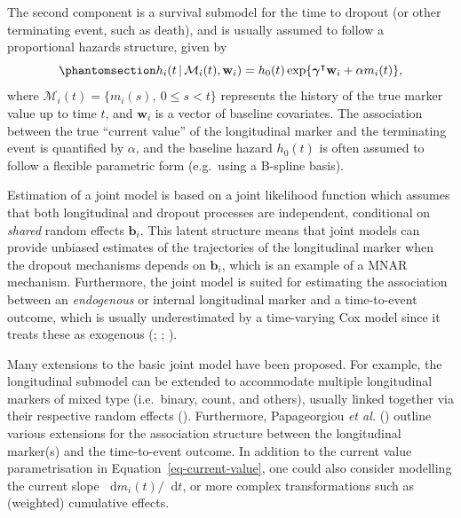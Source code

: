 \documentclass[
  letterpaper,
  DIV=11,
  numbers=noendperiod]{scrreprt}
\newcommand{\given}{\,|\,}
\newcommand\diff{\mathop{}\!\mathrm{d}}
\begin{document}
The second component is a survival submodel for the time to dropout (or
other terminating event, such as death), and is usually assumed to
follow a proportional hazards structure, given by
\begin{equation}\phantomsection\label{eq-current-value}{
h_i(t \given \mathcal{M}_i(t),\mathbf{w}_i) = h_0(t)\exp\{\boldsymbol{\gamma}^\intercal\mathbf{w}_i + \alpha m_i(t)\},
}\end{equation} where \(\mathcal{M}_i(t) = \{m_i(s), \ 0 \leq s < t\}\)
represents the history of the true marker value up to time \(t\), and
\(\mathbf{w}_i\) is a vector of baseline covariates. The association
between the true ``current value'' of the longitudinal marker and the
terminating event is quantified by \(\alpha\), and the baseline hazard
\(h_0(t)\) is often assumed to follow a flexible parametric form
(e.g.~using a B-spline basis).

Estimation of a joint model is based on a joint likelihood function
which assumes that both longitudinal and dropout processes are
independent, conditional on \emph{shared} random effects
\(\boldsymbol{b}_i\). This latent structure means that joint models can
provide unbiased estimates of the trajectories of the longitudinal
marker when the dropout mechanisms depends on \(\boldsymbol{b}_i\),
which is an example of a MNAR mechanism. Furthermore, the joint model is
suited for estimating the association between an \emph{endogenous} or
internal longitudinal marker and a time-to-event outcome, which is
usually underestimated by a time-varying Cox model since it treats these
as exogenous (;
;
).

Many extensions to the basic joint model have been proposed. For
example, the longitudinal submodel can be extended to accommodate
multiple longitudinal markers of mixed type (i.e.~binary, count, and
others), usually linked together via their respective random effects
(). Furthermore, Papageorgiou \emph{et al.}
() outline
various extensions for the association structure between the
longitudinal marker(s) and the time-to-event outcome. In addition to the
current value parametrisation in Equation~\ref{eq-current-value}, one
could also consider modelling the current slope
\(\diff m_i(t) / \diff t\), or more complex transformations such as
(weighted) cumulative effects.
\end{document}
